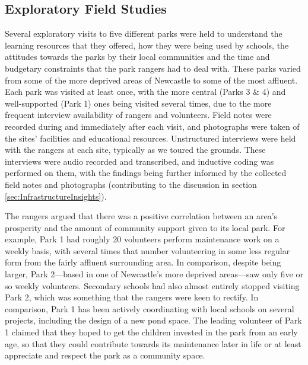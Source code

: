 \subsection{Exploratory Field Studies}
Several exploratory visits to five different parks were held to understand the learning resources that they offered, how they were being used by schools, the attitudes towards the parks by their local communities and the time and budgetary constraints that the park rangers had to deal with. These parks varied from some of the more deprived areas of Newcastle to some of the most affluent. Each park was visited at least once, with the more central (Parks 3 \& 4) and well-supported (Park 1) ones being visited several times, due to the more frequent interview availability of rangers and volunteers. Field notes were recorded during and immediately after each visit, and photographs were taken of the sites' facilities and educational resources. Unstructured interviews were held with the rangers at each site, typically as we toured the grounds. These interviews were audio recorded and transcribed, and inductive coding was performed on them, with the findings being further informed by the collected field notes and photographs (contributing to the discussion in section \ref{sec:InfrastructureInsights}).

The rangers argued that there was a positive correlation between an area’s prosperity and the amount of community support given to its local park. For example, Park 1 had roughly 20 volunteers perform maintenance work on a weekly basis, with several times that number volunteering in some less regular form from the fairly affluent surrounding area. In comparison, despite being larger, Park 2---based in one of Newcastle’s more deprived areas---saw only five or so weekly volunteers. Secondary schools had also almost entirely stopped visiting Park 2, which was something that the rangers were keen to rectify. In comparison, Park 1 has been actively coordinating with local schools on several projects, including the design of a new pond space. The leading volunteer of Park 1 claimed that they hoped to get the children invested in the park from an early age, so that they could contribute towards its maintenance later in life or at least appreciate and respect the park as a community space. 

